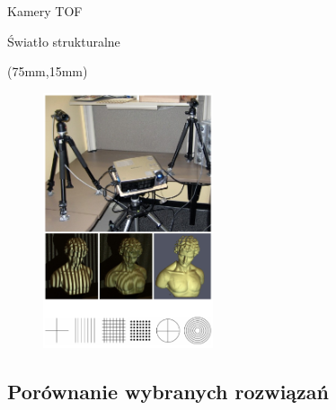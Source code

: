 \documentclass[xcolor=x11names,compress]{beamer}
\renewcommand{\(}{\begin{columns}}
\renewcommand{\)}{\end{columns}}
\newcommand{\<}[1]{\begin{column}{#1}}
\renewcommand{\>}{\end{column}}
\begin{document}
\begin{frame}{Kamery TOF}

\end{frame}

\begin{frame}{Światło strukturalne}

\begin{textblock*}{50mm}(75mm,15mm)%
    \begin{minipage}[l]{50mm}%

	\begin{figure}[h!]
    \centering
    \includegraphics[width=5.0cm]{../Common/img/struct_vert}
    \end{figure}

    \end{minipage}
\end{textblock*}

\end{frame}

\subsection{Porównanie wybranych rozwiązań}
\end{document}
